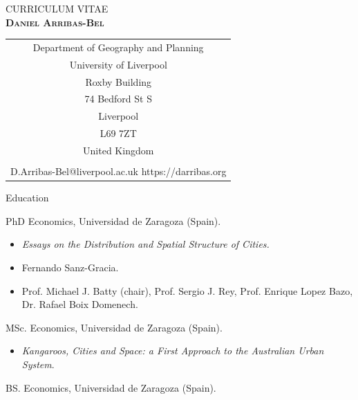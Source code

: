 \documentclass[12pt,2up]{article}
\begin{document}
\setlength{\cvlabelsep}{2mm}
\setlength{\cvlabelwidth}{13mm}
\begin{cv}{} 
\begin{center}
CURRICULUM VITAE\\
\vspace{.25in}
\textbf{\textsc{Daniel Arribas-Bel}
}
\end{center}
\begin{center}
\begin{tabular}{c}
    Department of Geography and Planning \\
    University of Liverpool \\
    Roxby Building \\
    74 Bedford St S \\
    Liverpool \\
    L69 7ZT \\
    United Kingdom \\
    \\
    {\small D.Arribas-Bel@liverpool.ac.uk} \hspace{0.5cm}
	{\small https://darribas.org}
\end{tabular}
\end{center}
 \begin{cvlist}{Education}

\item[2010] PhD Economics, Universidad de Zaragoza (Spain).
    \begin{itemize}
        \item[] \textit{Essays on the Distribution and Spatial Structure of
            Cities.}
        \item[\begin{small}Supervisor:\end{small}] \begin{small}Fernando
                Sanz-Gracia.\end{small} 
        \item[\begin{small}Committee:\end{small}] \begin{small}Prof. Michael J. Batty (chair), Prof. Sergio J. Rey, Prof. Enrique Lopez Bazo, Dr. Rafael Boix Domenech.\end{small} 
    \end{itemize}
\item[2008] MSc. Economics, Universidad de Zaragoza (Spain).
    \begin{itemize}
        \item[] \textit{Kangaroos, Cities and Space: a First Approach to the
            Australian Urban System}.
    \end{itemize}
\item[2006] BS. Economics, Universidad de Zaragoza (Spain).
  \end{cvlist}


\end{cv}
\end{document}
